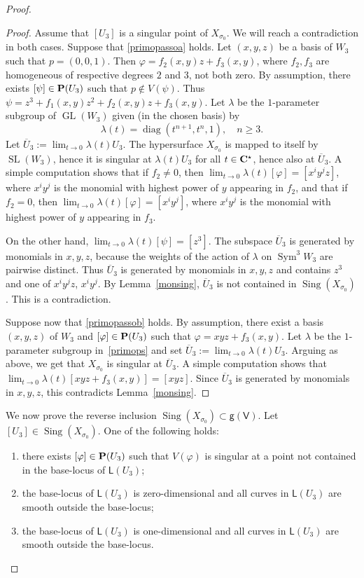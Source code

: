 \documentclass[11pt]{article}
\newenvironment{enumeratea}
{\bgroup\def\theenumi{\alph{enumi}}\def\theenumii{\arabic{enumii}}\begin{enumerate}}
{\end{enumerate}\egroup}
\theoremstyle{definition}
\newcommand\sfg{\mathsf{g}}
\newcommand\sfL{\mathsf{L}}
\newcommand\sfV{\mathsf{V}}
\newcommand\gv{\sfg(\sfV)}
\let\phi\varphi
\let\ov\overline
\DeclareMathOperator{\GL}{GL}
\DeclareMathOperator{\Sing}{Sing}\let\sing\Sing
\DeclareMathOperator{\Sym}{Sym}
\DeclareMathOperator{\SL}{SL}
\DeclareMathOperator{\diag}{diag}
\begin{document}
\begin{proof}
\begin{proof}
Assume that $[U_3]$ is a singular point of $X_{\sigma_0}$. We will reach a contradiction in both cases.
Suppose that \eqref{primopassoa} holds. Let $(x,y,z)$ be a basis of $W_3$ such that $p=(0,0,1)$. Then
$\phi=f_2(x,y)z+f_3(x,y)$, where $f_2,f_3$ are homogeneous of respective degrees $2$ and $3$, not both zero. By assumption, there exists $[\psi]\in\PP(U_3)$ such that $p\notin V(\psi)$. Thus $\psi=z^3+f_1(x,y)z^2+f_2(x,y)z+f_3(x,y)$. Let $\lambda$ be the $1$-parameter subgroup of $\GL(W_3)$ given (in the chosen basis) by
\begin{equation}\label{primops}
\lambda(t)=\diag(t^{n+1},t^{n},1),\quad n\ge 3.
\end{equation}
Let $\ov{U}_3 :=\lim_{t\to 0}\lambda(t)U_3$. The hypersurface $X_{\sigma_0}$ is mapped to itself by $\SL(W_3)$, hence it is singular at $\lambda(t)U_3$ for all $t\in\CC^\star$,
hence also at $\ov{U}_3$. A simple computation shows that if $f_2\ne 0$, then
$\lim_{t\to 0}\lambda(t)[\phi]=[x^i y^jz]$, where $x^i y^j$ is the monomial with highest power of $y$ appearing in $f_2$, and that if $f_2=0$, then $\lim_{t\to 0}\lambda(t)[\phi]=[x^i y^j]$, where $x^i y^j$ is the monomial with highest power of $y$ appearing in $f_3$.

On the other hand, $\lim_{t\to 0}\lambda(t)[\psi]=[z^3]$. The subspace $\ov{U}_3$ is generated by monomials in $x,y,z$, because the weights of the action of $\lambda$ on $\Sym^3\! W_3$ are pairwise distinct. Thus $\ov{U}_3$ is generated by monomials in $x,y,z$ and contains $z^3$ and one of $x^i y^jz$, $x^i y^j$. By Lemma~\ref{monsing}, $\ov{U}_3$ is not contained in $\sing (X_{\sigma_0})$. This is a contradiction.

Suppose now that \eqref{primopassob} holds. By assumption, there exist a basis $(x,y,z)$ of $W_3$ and $[\phi]\in\PP(U_3)$ such that $\phi=xyz+f_3(x,y)$. Let $\lambda$ be the $1$-parameter subgroup in~\eqref{primops} and
set $\ov{U}_3 :=\lim_{t\to 0}\lambda(t)U_3$. Arguing as above, we get that $X_{\sigma_0}$ is singular at $\ov{U}_3$. A simple computation shows that $\lim_{t\to 0}\lambda(t)[xyz+f_3(x,y)]=[xyz]$. Since $\ov{U}_3$ is generated by monomials in $x,y,z$, this contradicts Lemma~\ref{monsing}.
\end{proof}

We now prove the reverse inclusion $\Sing( X_{\sigma_0})\subset \gv$.
Let $[U_3]\in \Sing( X_{\sigma_0})$. One of the following holds:
\begin{enumeratea}
\item\label{enum:a}
there exists $[\phi]\in \PP(U_3)$ such that $V(\phi)$ is singular at a point not contained in the base-locus of $\sfL(U_3)$;
\item\label{enum:b}
the base-locus of $\sfL(U_3)$ is zero-dimensional and all curves in $\sfL(U_3)$ are smooth outside the base-locus;
\item\label{enum:c}
the base-locus of $\sfL(U_3)$ is one-dimensional and all curves in $\sfL(U_3)$ are smooth outside the base-locus.
\end{enumeratea}


\end{proof}
\end{document}

